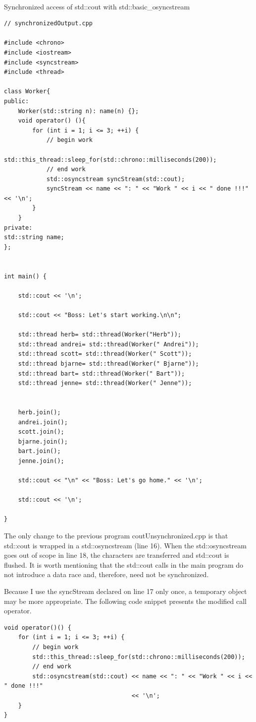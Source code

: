 \hspace*{\fill} \\ %
\noindent
Synchronized access of std::cout with std::basic\_osyncstream
\begin{lstlisting}[style=styleCXX]
// synchronizedOutput.cpp

#include <chrono>
#include <iostream>
#include <syncstream>
#include <thread>

class Worker{
public:
	Worker(std::string n): name(n) {};
	void operator() (){
		for (int i = 1; i <= 3; ++i) {
			// begin work
			std::this_thread::sleep_for(std::chrono::milliseconds(200));
			// end work
			std::osyncstream syncStream(std::cout);
			syncStream << name << ": " << "Work " << i << " done !!!" << '\n';
		}
	}
private:
std::string name;
};


int main() {

	std::cout << '\n';
	
	std::cout << "Boss: Let's start working.\n\n";
	
	std::thread herb= std::thread(Worker("Herb"));
	std::thread andrei= std::thread(Worker(" Andrei"));
	std::thread scott= std::thread(Worker(" Scott"));
	std::thread bjarne= std::thread(Worker(" Bjarne"));
	std::thread bart= std::thread(Worker(" Bart"));
	std::thread jenne= std::thread(Worker(" Jenne"));
	
	
	herb.join();
	andrei.join();
	scott.join();
	bjarne.join();
	bart.join();
	jenne.join();
	
	std::cout << "\n" << "Boss: Let's go home." << '\n';
	
	std::cout << '\n';

}
\end{lstlisting}

The only change to the previous program coutUnsynchronized.cpp is that std::cout is wrapped in a std::osyncstream (line 16). When the std::osyncstream goes out of scope in line 18, the characters are transferred and std::cout is flushed. It is worth mentioning that the std::cout calls in the main program do not introduce a data race and, therefore, need not be synchronized.

Because I use the syncStream declared on line 17 only once, a temporary object may be more appropriate. The following code snippet presents the modified call operator.


\begin{lstlisting}[style=styleCXX]
void operator()() {
	for (int i = 1; i <= 3; ++i) {
		// begin work
		std::this_thread::sleep_for(std::chrono::milliseconds(200));
		// end work
		std::osyncstream(std::cout) << name << ": " << "Work " << i << " done !!!"
		                            << '\n';
	}
}
\end{lstlisting}

